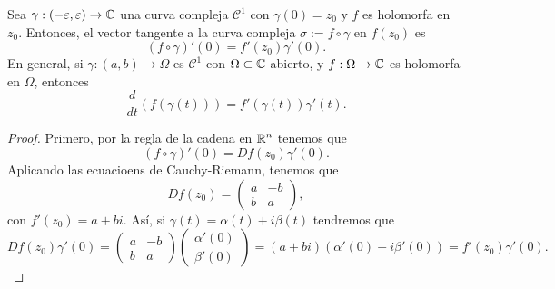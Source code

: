 \begin{prop}
Sea $\displaystyle \gamma:\left(-\varepsilon, \varepsilon \right)\to \mathbb{C} $ una curva compleja $\displaystyle \mathcal{C}^{1} $ con $\displaystyle \gamma\left(0\right)=z_{0} $ y $\displaystyle f $ es holomorfa en $\displaystyle z_{0} $. Entonces, el vector tangente a la curva compleja $\displaystyle \sigma:=f\circ \gamma  $ en $\displaystyle f\left(z_{0}\right) $ es
\[\left(f\circ \gamma \right)'\left(0\right)=f'\left(z_{0}\right)\gamma'\left(0\right) .\]
En general, si $\displaystyle \gamma:\left(a,b\right)\to \Omega  $ es $\displaystyle \mathcal{C}^{1} $ con $\displaystyle \Omega \subset \mathbb{C}  $ abierto, y $\displaystyle f : \Omega \to \mathbb{C} $ es holomorfa en $\displaystyle \Omega  $, entonces
\[\frac{d}{dt}\left(f\left(\gamma\left(t\right)\right)\right)=f'\left(\gamma\left(t\right)\right)\gamma'\left(t\right) .\]
\end{prop}
\begin{proof}
Primero, por la regla de la cadena en $\displaystyle \mathbb{R}^{n} $ tenemos que 
\[\left(f\circ \gamma \right)'\left(0\right)=Df\left(z_{0}\right)\gamma'\left(0\right) .\]
Aplicando las ecuacioens de Cauchy-Riemann, tenemos que
\[Df\left(z_{0}\right)=\begin{pmatrix} a & -b \\ b & a \end{pmatrix} ,\]
con $\displaystyle f'\left(z_{0}\right)= a + bi $. Así, si $\displaystyle \gamma\left(t\right)=\alpha\left(t\right) + i\beta\left(t\right) $ tendremos que 
\[Df\left(z_{0}\right)\gamma'\left(0\right)=\begin{pmatrix} a & -b \\ b & a \end{pmatrix}\begin{pmatrix} \alpha'\left(0\right)\\\beta'\left(0\right) \end{pmatrix}=\left(a + bi\right)\left(\alpha'\left(0\right)+i\beta'\left(0\right)\right)=f'\left(z_{0}\right)\gamma'\left(0\right) .\]
\end{proof}
